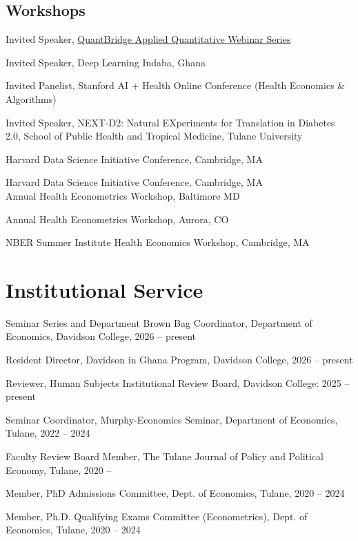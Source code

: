 \documentclass[12pt,letterpaper]{article}
\renewenvironment{itemize}{
	\begin{list}{}{
			\setlength{\leftmargin}{1em}
			\setlength{\itemsep}{0.15em}
			\setlength{\parskip}{0pt}
			\setlength{\parsep}{0.2em}
		}
	}{
	\end{list}
}
\begin{document}
\subsection*{Workshops}
\begin{description}[font=\mdseries]
	\item[2026] Invited Speaker, \href{https://github.com/austindenteh/staggered-did-workshop}{QuantBridge Applied Quantitative Webinar Series} 
	\item[2023] Invited Speaker, Deep Learning Indaba, Ghana 
	\item[2021] Invited Panelist, Stanford AI + Health Online Conference (Health Economics \& Algorithms)
	\item[2020] Invited Speaker, NEXT-D2:  Natural EXperiments for Translation in Diabetes 2.0, School of Public Health and Tropical Medicine, Tulane University  
	\item[2019] Harvard Data Science Initiative Conference, Cambridge, MA
	\item[2018] Harvard Data Science Initiative Conference, Cambridge, MA\\
	Annual Health Econometrics Workshop, Baltimore MD
	\item[2016] Annual Health Econometrics Workshop, Aurora, CO
	\item[2015] NBER Summer Institute Health Economics Workshop, Cambridge, MA
\end{description}

\section*{Institutional Service}
\begin{itemize}
	\item Seminar Series and Department Brown Bag Coordinator, Department of Economics, Davidson College, 2026 -- present
	\item Resident Director, Davidson in Ghana Program, Davidson College, 2026 -- present
	\item Reviewer, Human Subjects Institutional Review Board, Davidson College: 2025 -- present
	\item Seminar Coordinator, Murphy-Economics Seminar, Department of Economics, Tulane, 2022 -- 2024
	\item Faculty Review Board Member, The Tulane Journal of Policy and Political Economy, Tulane, 2020 --
	\item Member, PhD Admissions Committee, Dept. of Economics, Tulane, 2020 -- 2024
	\item Member, Ph.D. Qualifying Exams Committee (Econometrics), Dept. of Economics, Tulane, 2020 -- 2024
\end{itemize}
\end{document}
